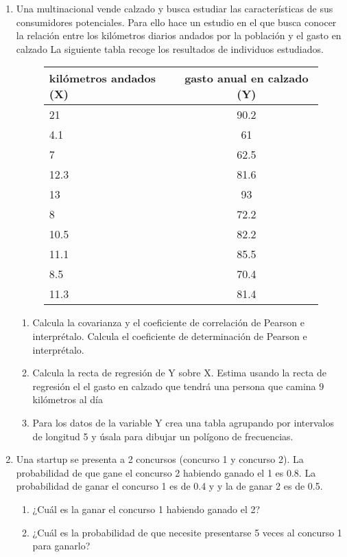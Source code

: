 \documentclass[]{article}
\theoremstyle{plain}
\theoremstyle{definition}
\theoremstyle{definition} %
\begin{document}
\begin{enumerate}
  \item 
  Una multinacional vende calzado y busca estudiar las características de sus consumidores potenciales.
  Para ello hace un estudio en el que busca conocer la relación entre los kilómetros diarios andados por la población y el gasto en calzado
  La siguiente tabla recoge los resultados de individuos estudiados.
 \begin{figure}
   \centering
   \begin{tabular}{lc}
     kilómetros andados (X) & gasto anual en calzado (Y)\\
     \hline
     21   & 90.2      \\  
     4.1  & 61         \\ 
     7    & 62.5       \\
     12.3 & 81.6      \\
     13   & 93        \\
     8    & 72.2       \\
     10.5 & 82.2      \\    
     11.1 & 85.5     \\
     8.5  & 70.4     \\
     11.3 & 81.4     \\
   \end{tabular}
 \end{figure}
 \begin{enumerate}
   \item
   Calcula la covarianza y el coeficiente de correlación de Pearson e
   interprétalo. Calcula el coeficiente de determinación de Pearson e interprétalo.
 \item
   Calcula la recta de regresión de Y sobre X. 
   Estima usando la recta de regresión el el gasto en calzado que tendrá una persona que camina $9$ kilómetros al día
 
 \item Para los datos de la variable Y crea una tabla agrupando por intervalos de longitud 5 y úsala para dibujar un polígono de frecuencias.
 \end{enumerate}
 
 
  \item  Una startup se presenta a 2 concursos (concurso 1 y concurso 2). 
  La probabilidad de que gane el concurso 2 habiendo ganado el 1 es 0.8. La probabilidad de ganar 
  el concurso 1 es de 0.4 y y la de ganar 2 es de 0.5. 
  \begin{enumerate}
    \item ¿Cuál es la ganar el concurso 1 habiendo ganado el 2?
    \item ¿Cuál es la probabilidad de que necesite presentarse 5 veces al concurso 1 para ganarlo?
  \end{enumerate}
 

\end{enumerate}
\end{document}
